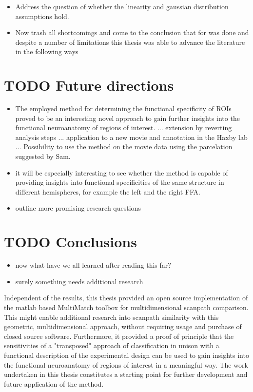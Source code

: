 \documentclass[a4paper, 12pt]{scrreprt}
\begin{document}
\begin{itemize}
	\item Address the question of whether the linearity and gaussian distribution assumptions hold.
	\item Now trash all shortcomings and come to the conclusion that for was done and despite a number of limitations this thesis was able to advance the literature in the following ways
\end{itemize}

\section{TODO Future directions}
\begin{itemize}
	\item The employed method for determining the functional specificity of ROIs proved to be an interesting novel approach to gain further insights into the functional neuroanatomy of regions of interest. ... extension by reverting analysis steps ... application to a new movie and annotation in the Haxby lab ... Possibility to use the method on the movie data using the parcelation suggested by Sam. 
	\item it will be especially interesting to see whether the method is capable of providing insights into functional specificities of the same structure in different hemispheres, for example the left and the right FFA.
	\item outline more promising research questions 
\end{itemize}


\section{TODO Conclusions}
\begin{itemize}
	\item now what have we all learned after reading this far?
	\item surely something needs additional research

\end{itemize}
Independent of the results, this thesis provided an open source implementation of the matlab based MultiMatch toolbox for multidimensional scanpath comparison. This might enable additional research into scanpath similarity with this geometric, multidimensional approach, without requiring usage and purchase of closed source software. \newline Furthermore, it provided a proof of principle that the sensitivities of a "transposed" approach of classification in unison with a functional description of the experimental design can be used to gain insights into the functional neuroanatomy of regions of interest in a meaningful way. The work undertaken in this thesis constitutes a starting point for further development and future application of the method.
\end{document}
